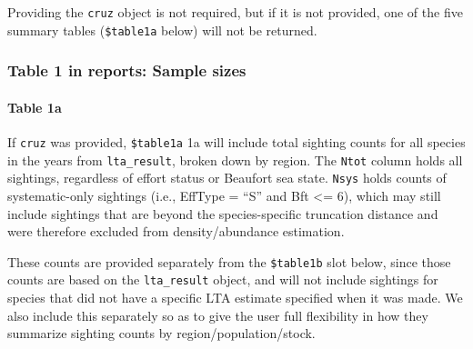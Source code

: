 \documentclass[
]{book}
\newenvironment{Shaded}{\begin{snugshade}}{\end{snugshade}}
\newcommand{\DataTypeTok}[1]{\textcolor[rgb]{0.13,0.29,0.53}{#1}}
\newcommand{\DecValTok}[1]{\textcolor[rgb]{0.00,0.00,0.81}{#1}}
\newcommand{\KeywordTok}[1]{\textcolor[rgb]{0.13,0.29,0.53}{\textbf{#1}}}
\newcommand{\NormalTok}[1]{#1}
\newcommand{\OperatorTok}[1]{\textcolor[rgb]{0.81,0.36,0.00}{\textbf{#1}}}
\newcommand{\StringTok}[1]{\textcolor[rgb]{0.31,0.60,0.02}{#1}}
\begin{document}
Providing the \texttt{cruz} object is not required, but if it is not provided, one of the five summary tables (\texttt{\$table1a} below) will not be returned.

\begin{Shaded}
\end{Shaded}

\hypertarget{table-1-in-reports-sample-sizes}{%
\subsubsection*{Table 1 in reports: Sample sizes}\label{table-1-in-reports-sample-sizes}}

\hypertarget{table-1a}{%
\paragraph{Table 1a}\label{table-1a}}

If \texttt{cruz} was provided, \texttt{\$table1a} 1a will include total sighting counts for all species in the years from \texttt{lta\_result}, broken down by region. The \texttt{Ntot} column holds all sightings, regardless of effort status or Beaufort sea state. \texttt{Nsys} holds counts of systematic-only sightings (i.e., EffType = ``S'' and Bft \textless= 6), which may still include sightings that are beyond the species-specific truncation distance and were therefore excluded from density/abundance estimation.

These counts are provided separately from the \texttt{\$table1b} slot below, since those counts are based on the \texttt{lta\_result} object, and will not include sightings for species that did not have a specific LTA estimate specified when it was made. We also include this separately so as to give the user full flexibility in how they summarize sighting counts by region/population/stock.

\begin{Shaded}
\end{Shaded}
\end{document}
